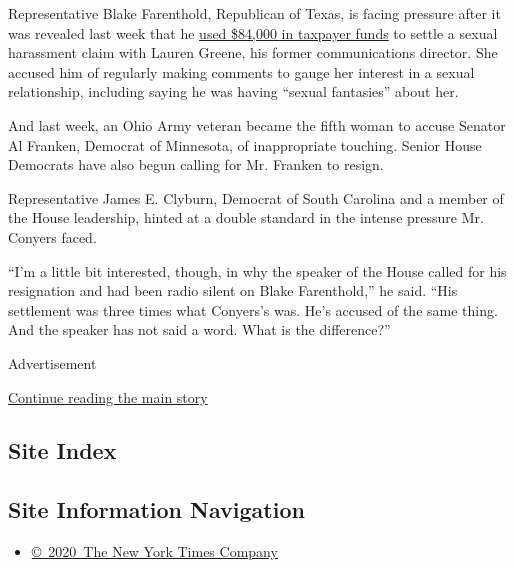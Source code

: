 Representative Blake Farenthold, Republican of Texas, is facing pressure
after it was revealed last week that he
\href{https://www.nytimes3xbfgragh.onion/2017/12/01/us/politics/farenthold-sexual-harassement-settlement-taxpayers-congress.html}{used
\$84,000 in taxpayer funds} to settle a sexual harassment claim with
Lauren Greene, his former communications director. She accused him of
regularly making comments to gauge her interest in a sexual
relationship, including saying he was having ``sexual fantasies'' about
her.

And last week, an Ohio Army veteran became the fifth woman to accuse
Senator Al Franken, Democrat of Minnesota, of inappropriate touching.
Senior House Democrats have also begun calling for Mr. Franken to
resign.

Representative James E. Clyburn, Democrat of South Carolina and a member
of the House leadership, hinted at a double standard in the intense
pressure Mr. Conyers faced.

``I'm a little bit interested, though, in why the speaker of the House
called for his resignation and had been radio silent on Blake
Farenthold,'' he said. ``His settlement was three times what Conyers's
was. He's accused of the same thing. And the speaker has not said a
word. What is the difference?''

Advertisement

\protect\hyperlink{after-bottom}{Continue reading the main story}

\hypertarget{site-index}{%
\subsection{Site Index}\label{site-index}}

\hypertarget{site-information-navigation}{%
\subsection{Site Information
Navigation}\label{site-information-navigation}}

\begin{itemize}
\tightlist
\item
  \href{https://help.nytimes3xbfgragh.onion/hc/en-us/articles/115014792127-Copyright-notice}{©~2020~The
  New York Times Company}
\end{itemize}

